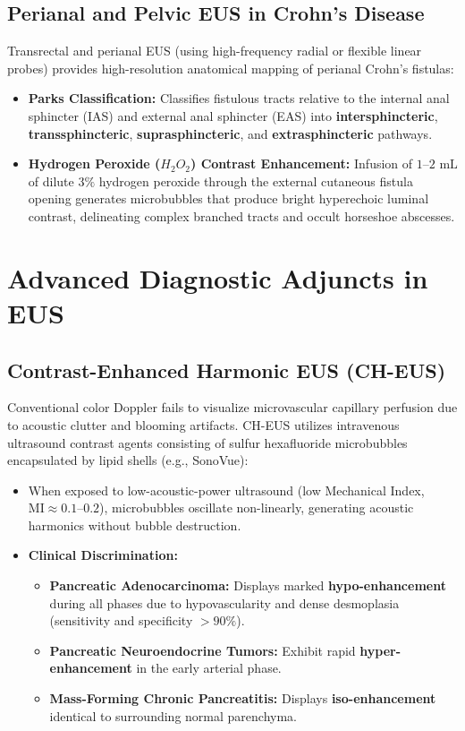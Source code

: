 \documentclass[11pt,a4paper]{article}
\begin{document}
\subsection{Perianal and Pelvic EUS in Crohn's Disease}
Transrectal and perianal EUS (using high-frequency radial or flexible linear probes) provides high-resolution anatomical mapping of perianal Crohn's fistulas:
\begin{itemize}[leftmargin=2em]
    \item \textbf{Parks Classification:} Classifies fistulous tracts relative to the internal anal sphincter (IAS) and external anal sphincter (EAS) into \textbf{intersphincteric}, \textbf{transsphincteric}, \textbf{suprasphincteric}, and \textbf{extrasphincteric} pathways.
    \item \textbf{Hydrogen Peroxide ($H_2O_2$) Contrast Enhancement:} Infusion of $1\text{--}2\text{ mL}$ of dilute $3\%$ hydrogen peroxide through the external cutaneous fistula opening generates microbubbles that produce bright hyperechoic luminal contrast, delineating complex branched tracts and occult horseshoe abscesses.
\end{itemize}

\section{Advanced Diagnostic Adjuncts in EUS}
\subsection{Contrast-Enhanced Harmonic EUS (CH-EUS)}
Conventional color Doppler fails to visualize microvascular capillary perfusion due to acoustic clutter and blooming artifacts. CH-EUS utilizes intravenous ultrasound contrast agents consisting of sulfur hexafluoride microbubbles encapsulated by lipid shells (e.g., SonoVue):
\begin{itemize}[leftmargin=2em]
    \item When exposed to low-acoustic-power ultrasound (low Mechanical Index, $\text{MI} \approx 0.1\text{--}0.2$), microbubbles oscillate non-linearly, generating acoustic harmonics without bubble destruction.
    \item \textbf{Clinical Discrimination:}
    \begin{itemize}
        \item \textbf{Pancreatic Adenocarcinoma:} Displays marked \textbf{hypo-enhancement} during all phases due to hypovascularity and dense desmoplasia (sensitivity and specificity $> 90\%$).
        \item \textbf{Pancreatic Neuroendocrine Tumors:} Exhibit rapid \textbf{hyper-enhancement} in the early arterial phase.
        \item \textbf{Mass-Forming Chronic Pancreatitis:} Displays \textbf{iso-enhancement} identical to surrounding normal parenchyma.
    \end{itemize}
\end{itemize}
\end{document}
